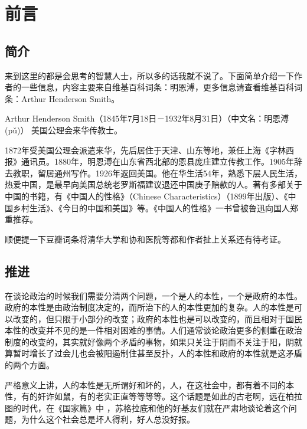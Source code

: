 \documentclass[12pt,oneside]{book}
\begin{document}
\frontmatter

\author{亚瑟·亨·史密斯}
\titleLA

\chapter*{前言}
\begin{common-format}
\section*{简介}
来到这里的都是会思考的智慧人士，所以多的话我就不说了。下面简单介绍一下作者的一些信息，内容主要来自维基百科词条：明恩溥，更多信息请查看维基百科词条：Arthur Henderson Smith。

Arthur Henderson Smith（1845年7月18日－1932年8月31日）（中文名：明恩溥(pǔ)） 美国公理会来华传教士。

1872年受美国公理会派遣来华，先后居住于天津、山东等地，兼任上海《字林西报》通讯员。1880年，明恩溥在山东省西北部的恩县庞庄建立传教工作。1905年辞去教职，留居通州写作。1926年返回美国。他在华生活54年，熟悉下层人民生活，热爱中国，是最早向美国总统老罗斯福建议退还中国庚子赔款的人。著有多部关于中国的书籍，有《中国人的性格》（Chinese Characteristics）（1899年出版）、《中国乡村生活》、《今日的中国和美国》等。《中国人的性格》一书曾被鲁迅向国人郑重推荐。

顺便提一下豆瓣词条将清华大学和协和医院等都和作者扯上关系还有待考证。


\section*{推进}
 在谈论政治的时候我们需要分清两个问题，一个是人的本性，一个是政府的本性。政府的本性是由政治制度决定的，而所治下的人的本性更加的复杂。人的本性是可以改变的，但只限于小部分的改变；政府的本性也是可以改变的，而且相对于国民本性的改变并不见的是一件相对困难的事情。人们通常谈论政治更多的侧重在政治制度的改变的，其实就好像两个矛盾的事物，如果只关注于阴而不关注于阳，阴就算暂时增长了过会儿也会被阳遏制住甚至反扑，人的本性和政府的本性就是这矛盾的两个方面。

严格意义上讲，人的本性是无所谓好和坏的，人，在这社会中，都有着不同的本性，有的奸诈如鼠，有的老实正直等等等等。这个话题是如此的古老啊，远在柏拉图的时代，在《国家篇》中 ，苏格拉底和他的好基友们就在严肃地谈论着这个问题，为什么这个社会总是坏人得利，好人总没好报。


\end{common-format}
\end{document}
